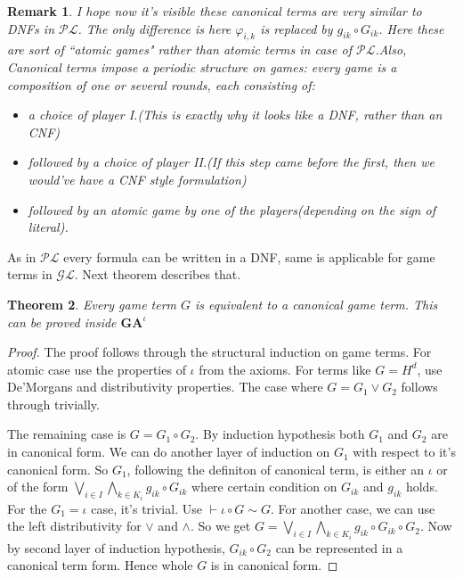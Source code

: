 \documentclass[10pt]{article}
\renewcommand{\phi}{\varphi}
\newcommand{\pl}{\mathcal{PL}}
\newcommand{\gl}{\mathcal{GL}}
\newcommand{\id}{\iota}
\newcommand{\com}[2]{#1 \circ #2 }
\newtheorem{theorem}{Theorem}
\newtheorem{remark}[theorem]{Remark}
\begin{document}
	\begin{remark}
		I hope now it's visible these canonical terms are very similar to DNFs in $\pl$. The only difference is here $\phi_{i,k}$ is replaced by $\com{g_{ik}}{G_{ik}}$. Here these are sort of ``atomic games" rather than atomic terms in case of $\pl$.Also, Canonical terms impose a periodic  structure on games: every game is a composition of one or several rounds, each consisting of:
		\begin{itemize}
			\item a choice of player I.(This is exactly why it looks like a DNF, rather than an CNF)
			\item followed by a choice of player II.(If this step came before the first, then we would've have a CNF style formulation)
			\item followed by an atomic game by one of the players(depending on the sign of literal).
		\end{itemize}
	\end{remark}
	As in $\pl$ every formula can be written in a DNF, same is applicable for game terms in $\gl$. Next theorem describes that.
	\begin{theorem}\label{th8}
		Every game term $G$ is equivalent to a canonical game term. This can be proved inside $\textbf{GA}^\id$
	\end{theorem}
	\begin{proof}
		The proof follows through the structural induction on game terms. For atomic case use the properties of $\id$ from the axioms. For terms like $G=H^d$, use De'Morgans and distributivity properties. The case where $G = G_1 \lor G_2$ follows through trivially.
		
		The remaining case is $G = \com{G_1}{G_2}$. By induction hypothesis both $G_1$ and $G_2$ are in canonical form. We can do another layer of induction on $G_1$ with respect to it's canonical form. So $G_1$, following the definiton of canonical term, is either an $\id$ or of the form $\bigvee_{i\in I} \bigwedge_{k \in K_i} g_{ik}\circ G_{ik}$ where certain condition on $G_{ik}$ and $g_{ik}$ holds. For the $G_1 = \id$ case, it's trivial. Use $\vdash \com{\id}{G} \sim G $. For another case, we can use the left distributivity for $\lor$ and $\land$. So we get $G = \bigvee_{i\in I} \bigwedge_{k \in K_i} g_{ik}\circ G_{ik} \circ G_2$. Now by second layer of induction hypothesis, $\com{G_{ik}}{G_2}$ can be represented in a canonical term form. Hence whole $G$ is in canonical form.
		\end{proof}
		
\end{document}
